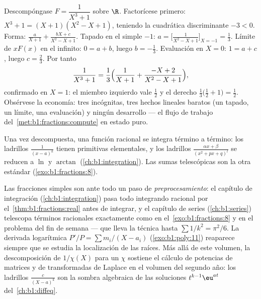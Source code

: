 \begin{example}\label{ex:b1:fractions:cubic}
Descompóngase $F = \dfrac{1}{X^3 + 1}$ sobre $\R$. Factorícese primero:
$X^3 + 1 = (X + 1)(X^2 - X + 1)$, teniendo la cuadrática discriminante
$-3 < 0$. Forma: $\frac{a}{X+1} + \frac{bX + c}{X^2 - X + 1}$. Tapado
en el  simple $-1$: $a = \bigl[\frac1{X^2 - X + 1}\bigr]_{X=-1} =
\frac13$. Límite de $xF(x)$ en el infinito: $0 = a + b$, luego
$b = -\frac13$. Evaluación en $X = 0$: $1 = a + c$, luego
$c = \frac23$. Por tanto
\[
\frac{1}{X^3+1} = \frac13\Bigl(\frac{1}{X+1}
+ \frac{-X + 2}{X^2 - X + 1}\Bigr) ,
\]
confirmado en $X = 1$: el miembro izquierdo vale $\frac12$ y el derecho
$\frac13\bigl(\frac12 + 1\bigr) = \frac12$. Obsérvese la economía: tres
incógnitas, tres hechos lineales baratos (un tapado, un límite, una
evaluación) y ningún desarrollo --- el flujo de trabajo
del~\cref{met:b1:fractions:compute} en estado puro.
\end{example}

\begin{remark}
Una vez descompuesta, una función racional se integra término a
término: los ladrillos $\frac{1}{(x-a)^k}$ tienen primitivas
elementales, y los ladrillos $\frac{\alpha x + \beta}{(x^2 + px + q)^l}$
se reducen a $\ln$ y $\arctan$ (\cref{ch:b1:integration}). Las sumas
telescópicas son la otra  estándar (\cref{exo:b1:fractions:8}).
\end{remark}

\begin{remark}\label{rem:b1:fractions:whereused}
Las fracciones simples son ante todo un paso de
\emph{preprocesamiento}: el capítulo de integración
(\cref{ch:b1:integration}) pasa todo integrando racional por
el~\cref{thm:b1:fractions:real} antes de integrar, y el capítulo de
series (\cref{ch:b1:series}) telescopa términos racionales exactamente
como en el~\cref{exo:b1:fractions:8} y en el problema del fin de
semana --- que lleva la técnica hasta $\sum 1/k^2 = \pi^2/6$. La
derivada logarítmica $P'/P = \sum m_i/(X - a_i)$
(\cref{exo:b1:poly:11}) reaparece siempre que se estudia la
localización de las raíces. Más allá de este volumen, la
descomposición de $1/\chi(X)$ para un  $\chi$
sostiene el cálculo de potencias de matrices y de transformadas de
Laplace en el volumen del segundo año: los ladrillos
$\frac{c}{(X - a)^k}$ son la sombra algebraica de las soluciones
$t^{k-1}\eu^{at}$ del~\cref{ch:b1:diffeq}.
\end{remark}

